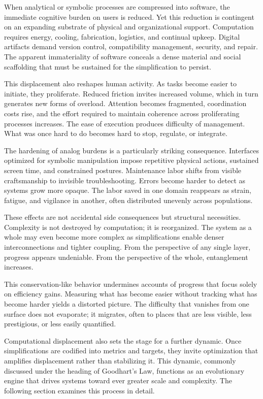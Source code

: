 \documentclass[12pt]{article}
\begin{document}
When analytical or symbolic processes are compressed into software, the immediate cognitive burden on users is reduced. Yet this reduction is contingent on an expanding substrate of physical and organizational support. Computation requires energy, cooling, fabrication, logistics, and continual upkeep. Digital artifacts demand version control, compatibility management, security, and repair. The apparent immateriality of software conceals a dense material and social scaffolding that must be sustained for the simplification to persist.

This displacement also reshapes human activity. As tasks become easier to initiate, they proliferate. Reduced friction invites increased volume, which in turn generates new forms of overload. Attention becomes fragmented, coordination costs rise, and the effort required to maintain coherence across proliferating processes increases. The ease of execution produces difficulty of management. What was once hard to do becomes hard to stop, regulate, or integrate.

The hardening of analog burdens is a particularly striking consequence. Interfaces optimized for symbolic manipulation impose repetitive physical actions, sustained screen time, and constrained postures. Maintenance labor shifts from visible craftsmanship to invisible troubleshooting. Errors become harder to detect as systems grow more opaque. The labor saved in one domain reappears as strain, fatigue, and vigilance in another, often distributed unevenly across populations.

These effects are not accidental side consequences but structural necessities. Complexity is not destroyed by computation; it is reorganized. The system as a whole may even become more complex as simplifications enable denser interconnections and tighter coupling. From the perspective of any single layer, progress appears undeniable. From the perspective of the whole, entanglement increases.

This conservation-like behavior undermines accounts of progress that focus solely on efficiency gains. Measuring what has become easier without tracking what has become harder yields a distorted picture. The difficulty that vanishes from one surface does not evaporate; it migrates, often to places that are less visible, less prestigious, or less easily quantified.

Computational displacement also sets the stage for a further dynamic. Once simplifications are codified into metrics and targets, they invite optimization that amplifies displacement rather than stabilizing it. This dynamic, commonly discussed under the heading of Goodhart’s Law, functions as an evolutionary engine that drives systems toward ever greater scale and complexity. The following section examines this process in detail.
\end{document}
